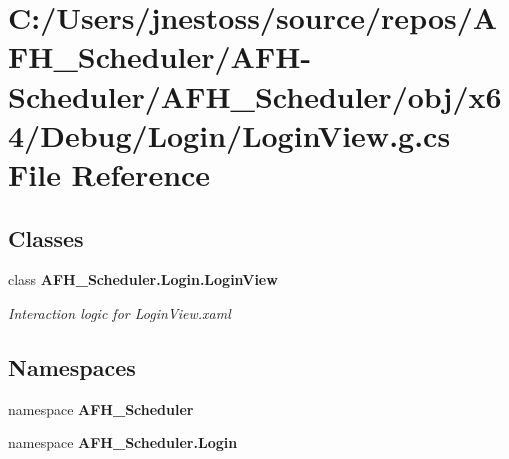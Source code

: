 \section{C\+:/\+Users/jnestoss/source/repos/\+A\+F\+H\+\_\+\+Scheduler/\+A\+F\+H-\/\+Scheduler/\+A\+F\+H\+\_\+\+Scheduler/obj/x64/\+Debug/\+Login/\+Login\+View.g.\+cs File Reference}
\label{x64_2_debug_2_login_2_login_view_8g_8cs}
\subsection*{Classes}
\begin{DoxyCompactItemize}
\item 
class \textbf{ A\+F\+H\+\_\+\+Scheduler.\+Login.\+Login\+View}
\begin{DoxyCompactList}\small\item\em Interaction logic for Login\+View.\+xaml \end{DoxyCompactList}\end{DoxyCompactItemize}
\subsection*{Namespaces}
\begin{DoxyCompactItemize}
\item 
namespace \textbf{ A\+F\+H\+\_\+\+Scheduler}
\item 
namespace \textbf{ A\+F\+H\+\_\+\+Scheduler.\+Login}
\end{DoxyCompactItemize}
